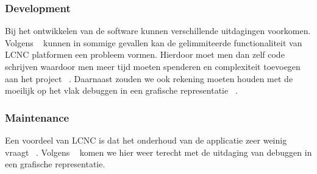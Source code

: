 \subsubsection*{Development}
\label{sub:development}
Bij het ontwikkelen van de software kunnen verschillende uitdagingen voorkomen.
Volgens ~\textcite{Rokis_2022} kunnen in sommige gevallen kan de gelimmiteerde functionaliteit van LCNC platformen een probleem vormen.
Hierdoor moet men dan zelf code schrijven waardoor men meer tijd moeten spenderen en complexiteit toevoegen aan het project ~\autocite{Rokis_2022}.
Daarnaast zouden we ook rekening moeten houden met de moeilijk op het vlak debuggen in een grafische representatie ~\autocite{Rokis_2022}.
\subsubsection*{Maintenance}
\label{sub:maintenance}
Een voordeel van LCNC is dat het onderhoud van de applicatie zeer weinig vraagt ~\autocite{Rokis_2022}.
Volgens ~\textcite{Rokis_2022} komen we hier weer terecht met de uitdaging van debuggen in een grafische representatie.








